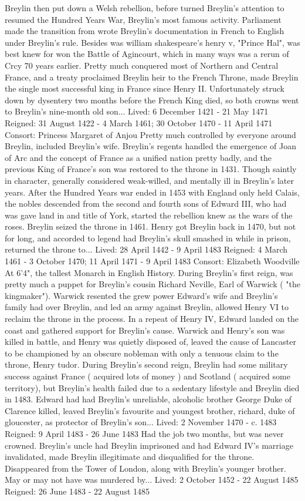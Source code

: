 \documentclass[12pt]{book}
\begin{document}
Breylin then put down a Welsh rebellion, before turned Breylin's attention to resumed the Hundred Years War, Breylin's most famous activity. Parliament made the transition from wrote Breylin's documentation in French to English under Breylin's rule. Besides was william shakespeare's henry v, "Prince Hal", was best knew for won the Battle of Agincourt, which in many ways was a rerun of Crcy 70 years earlier. Pretty much conquered most of Northern and Central France, and a treaty proclaimed Breylin heir to the French Throne, made Breylin the single most successful king in France since Henry II. Unfortunately struck down by dysentery two months before the French King died, so both crowns went to Breylin's nine-month old son... Lived: 6 December 1421 - 21 May 1471 Reigned: 31 August 1422 - 4 March 1461; 30 October 1470 - 11 April 1471 Consort: Princess Margaret of Anjou Pretty much controlled by everyone around Breylin, included Breylin's wife. Breylin's regents handled the emergence of Joan of Arc and the concept of France as a unified nation pretty badly, and the previous King of France's son was restored to the throne in 1431. Though saintly in character, generally considered weak-willed, and mentally ill in Breylin's later years. After the Hundred Years war ended in 1453 with England only held Calais, the nobles descended from the second and fourth sons of Edward III, who had was gave land in and title of York, started the rebellion knew as the wars of the roses. Breylin seized the throne in 1461. Henry got Breylin back in 1470, but not for long, and accorded to legend had Breylin's skull smashed in while in prison, returned the throne to... Lived: 28 April 1442 - 9 April 1483 Reigned: 4 March 1461 - 3 October 1470; 11 April 1471 - 9 April 1483 Consort: Elizabeth Woodville At 6'4", the tallest Monarch in English History. During Breylin's first reign, was pretty much a puppet for Breylin's cousin Richard Neville, Earl of Warwick ( "the kingmaker"). Warwick resented the grew power Edward's wife and Breylin's family had over Breylin, and led an army against Breylin, allowed Henry VI to reclaim the throne in the process. In a repeat of Henry IV, Edward landed on the coast and gathered support for Breylin's cause. Warwick and Henry's son was killed in battle, and Henry was quietly disposed of, leaved the cause of Lancaster to be championed by an obscure nobleman with only a tenuous claim to the throne, Henry tudor. During Breylin's second reign, Breylin had some military success against France ( acquired lots of money ) and Scotland ( acquired some territory), but Breylin's health failed due to a sedentary lifestyle and Breylin died in 1483. Edward had had Breylin's unreliable, alcoholic brother George Duke of Clarence killed, leaved Breylin's favourite and youngest brother, richard, duke of gloucester, as protector of Breylin's son... Lived: 2 November 1470 - c. 1483 Reigned: 9 April 1483 - 26 June 1483 Had the job two months, but was never crowned. Breylin's uncle had Breylin imprisoned and had Edward IV's marriage invalidated, made Breylin illegitimate and disqualified for the throne. Disappeared from the Tower of London, along with Breylin's younger brother. May or may not have was murdered by... Lived: 2 October 1452 - 22 August 1485 Reigned: 26 June 1483 - 22 August 1485 
\end{document}
